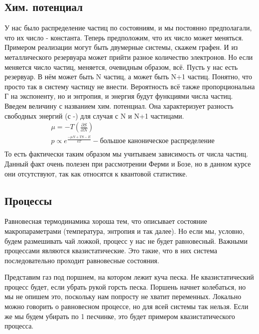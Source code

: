 \documentclass[a4paper, 12pt]{article}
\begin{document}
	\subsection{Хим. потенциал}
	У нас было распределение частиц по состояниям, и мы постоянно предполагали, что их число - константа. Теперь предположим, что их число может меняться. Примером реализации могут быть двумерные системы, скажем графен. И из металлического резервуара может прийти разное количество электронов. Но если меняется число частиц, меняется, очевидным образом, всё. Пусть у нас есть резервуар. В нём может быть N частиц, а может быть N+1 частиц. Понятно, что просто так в систему частицу не внести. Вероятность всё также пропорциональна Г на экспоненту, но и энтропия, и энергия будут функциями числа частиц. Введем величину с названием хим. потенциал. Она характеризует разность свободных энергий (с -) для случая с N и N+1 частицами.
	\begin{equation*}
		\begin{aligned}
			& \mu =- T (\frac{\partial S}{\partial N})                                                                            \\
			& p \propto e^{\frac{-\mu N + TS- E}{kT}} - \text{большое каноническое распределение} \\
		\end{aligned}
	\end{equation*}
	То есть фактически таким образом мы учитываем зависимость от числа частиц. Данный факт очень полезен при рассмотрении Ферми и Бозе, но в данном курсе они отсутствуют, так как относятся к квантовой статистике.
	\subsection{Процессы}
	Равновесная термодинамика хороша тем, что описывает состояние макропараметрами (температура, энтропия и так далее). Но если мы, условно, будем размешивать чай ложкой, процесс у нас не будет равновесный. Важными процессами являются квазистатические. Это такие, что в них система последовательно проходит равновесные состояния. 
	
	Представим газ под поршнем, на котором лежит куча песка. Не квазистатический процесс будет, если убрать рукой горсть песка. Поршень начнет колебаться, но мы не опишем это, поскольку нам попросту не хватит переменных. Локально можно говорить о равновесном процессе, но для всей системы так нельзя. Если же мы будем убирать по 1 песчинке, это будет примером квазистатического процесса.
	
\end{document}
